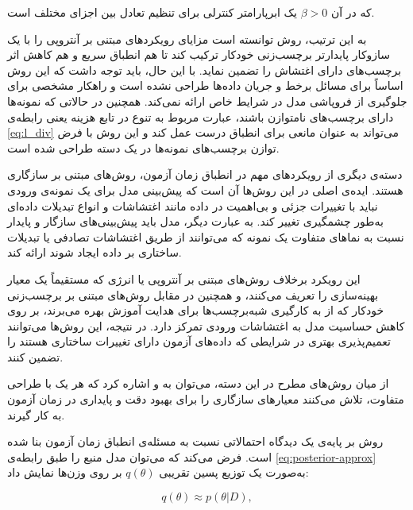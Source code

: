 که در آن $\beta > 0$ یک ابرپارامتر کنترلی برای تنظیم تعادل بین اجزای مختلف است.  

به این ترتیب، روش  توانسته است مزایای رویکردهای مبتنی بر آنتروپی را با یک سازوکار پایدارتر برچسب‌زنی خودکار ترکیب کند تا هم انطباق سریع و هم کاهش اثر برچسب‌های دارای اغتشاش را تضمین نماید. با این حال، باید توجه داشت که این روش اساساً برای مسائل برخط و جریان داده‌ها طراحی نشده است و راهکار مشخصی برای جلوگیری از فروپاشی مدل در شرایط خاص ارائه نمی‌کند. 
همچنین در حالاتی که نمونه‌ها دارای برچسب‌های {نامتوازن} باشند، عبارت مربوط به تنوع در تابع هزینه یعنی رابطه‌ی \ref{eq:l_div} می‌تواند به عنوان مانعی برای انطباق درست عمل کند و این روش با فرض توازن برچسب‌های نمونه‌ها در یک دسته طراحی شده است.


دسته‌ی دیگری از رویکردهای مهم در انطباق زمان آزمون، 
روش‌های مبتنی بر سازگاری هستند. 
ایده‌ی اصلی در این روش‌ها آن است که پیش‌بینی مدل برای یک نمونه‌ی ورودی 
نباید با تغییرات جزئی و بی‌اهمیت در داده 
مانند اغتشاشات و انواع {تبدیلات داده‌ای}
به‌طور چشمگیری تغییر کند.
به عبارت دیگر، مدل باید پیش‌بینی‌های سازگار و پایدار نسبت به نماهای متفاوت یک نمونه که می‌توانند از طریق اغتشاشات تصادفی یا تبدیلات ساختاری بر داده ایجاد شوند ارائه کند.

این رویکرد برخلاف روش‌های مبتنی بر آنتروپی یا انرژی که 
مستقیماً یک معیار بهینه‌سازی را تعریف می‌کنند، 
و همچنین در مقابل روش‌های مبتنی بر برچسب‌زنی خودکار که 
از به کارگیری شبه‌برچسب‌ها برای هدایت آموزش بهره می‌برند، 
بر روی کاهش حساسیت مدل به اغتشاشات ورودی تمرکز دارد. 
در نتیجه، این روش‌ها می‌توانند تعمیم‌پذیری بهتری در شرایطی که داده‌های آزمون 
دارای تغییرات ساختاری هستند را تضمین کنند.  

از میان روش‌های مطرح در این دسته، می‌توان به  و  اشاره کرد 
که هر یک با طراحی متفاوت، تلاش می‌کنند معیارهای سازگاری را برای بهبود دقت و پایداری 
در زمان آزمون به کار گیرند. 


روش  بر پایه‌ی یک دیدگاه احتمالاتی نسبت به مسئله‌ی انطباق زمان آزمون بنا شده است.  فرض می‌کند که می‌توان مدل منبع را طبق رابطه‌ی \ref{eq:posterior-approx} به‌صورت یک توزیع پسین تقریبی \(q(\theta)\) بر روی وزن‌ها نمایش داد\cite{petal}:  

\begin{equation}
	q(\theta) \approx p(\theta | D), 
	\label{eq:posterior-approx}
\end{equation}

